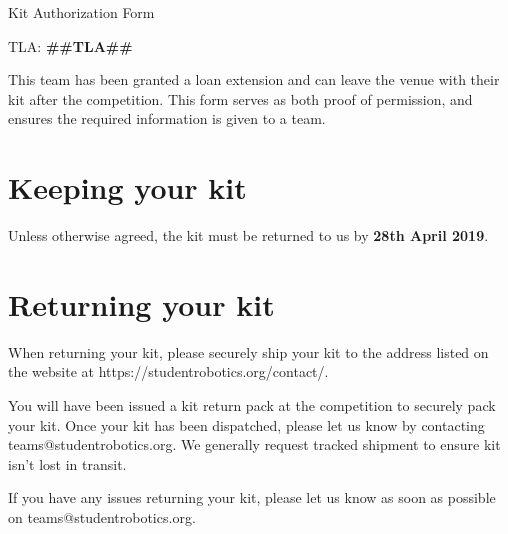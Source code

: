 \documentclass[a4paper, 12pt]{article}
\begin{document}
\setlength{\parskip}{3mm}

\begin{center}

    {\huge{Kit Authorization Form}}

\end{center}

\bigskip

{\Large{TLA: \textbf{##TLA##}}}

\bigskip

This team has been granted a loan extension and can leave the venue with their kit after the competition. This form serves as both proof of permission, and ensures the required information is given to a team.

\section{Keeping your kit}

Unless otherwise agreed, the kit must be returned to us by \textbf{28th April 2019}.

\section{Returning your kit}

When returning your kit, please securely ship your kit to the address listed on the website at https://studentrobotics.org/contact/.

You will have been issued a kit return pack at the competition to securely pack your kit. Once your kit has been dispatched, please let us know by contacting teams@studentrobotics.org. We generally request tracked shipment to ensure kit isn't lost in transit.

If you have any issues returning your kit, please let us know as soon as possible on teams@studentrobotics.org.
\end{document}
